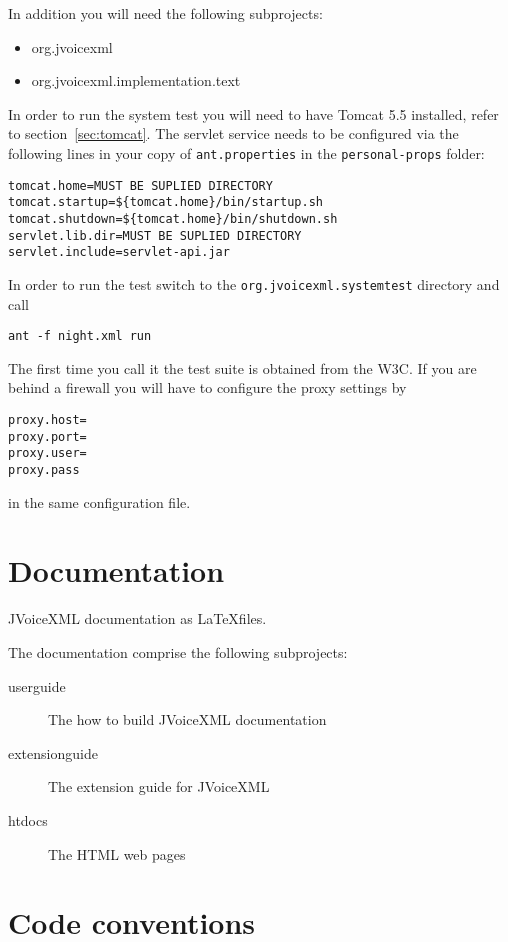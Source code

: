 \documentclass[11pt,a4paper]{article}
\begin{document}
In addition you will need the following subprojects:
\begin{itemize}
\item org.jvoicexml
\item org.jvoicexml.implementation.text
\end{itemize} 

In order to run the system test you will need to have Tomcat 5.5 installed,
refer to section~\ref{sec:tomcat}. The
servlet service needs to be configured via the following lines in your copy
of \lstinline{ant.properties} in the \lstinline{personal-props} folder:

\begin{lstlisting}
tomcat.home=MUST BE SUPLIED DIRECTORY
tomcat.startup=${tomcat.home}/bin/startup.sh
tomcat.shutdown=${tomcat.home}/bin/shutdown.sh
servlet.lib.dir=MUST BE SUPLIED DIRECTORY
servlet.include=servlet-api.jar
\end{lstlisting}

In order to run the test switch to the \lstinline{org.jvoicexml.systemtest}
directory and call
\begin{lstlisting}
ant -f night.xml run
\end{lstlisting}

The first time you call it the test suite is obtained from the W3C. If you are
behind a firewall you will have to configure the proxy settings by
\begin{lstlisting}
proxy.host=
proxy.port=
proxy.user=
proxy.pass
\end{lstlisting}
in the same configuration file.

\section{Documentation}

JVoiceXML documentation as \LaTeX files.

The documentation comprise the following subprojects:

\begin{description}
\item[userguide] The how to build JVoiceXML documentation
\item[extensionguide] The extension guide for JVoiceXML
\item[htdocs] The HTML web pages
\end{description}

\section{Code conventions}
\label{sec:code-conventions}
\end{document}
